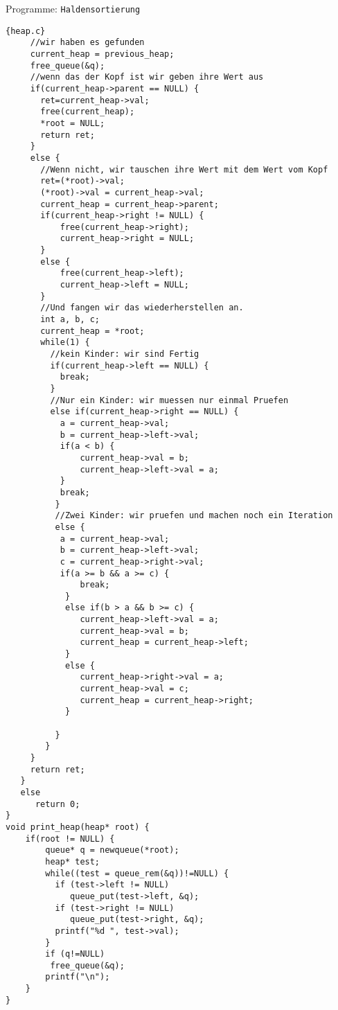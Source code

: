 \begin{myexampleprogram}{Programme: \texttt{Haldensortierung}}
\begin{lstlisting}{heap.c}
     //wir haben es gefunden
     current_heap = previous_heap;
     free_queue(&q);
     //wenn das der Kopf ist wir geben ihre Wert aus
     if(current_heap->parent == NULL) {
       ret=current_heap->val;
       free(current_heap);
       *root = NULL;
       return ret;
     }
     else {
       //Wenn nicht, wir tauschen ihre Wert mit dem Wert vom Kopf
       ret=(*root)->val;
       (*root)->val = current_heap->val;
       current_heap = current_heap->parent;
       if(current_heap->right != NULL) {
           free(current_heap->right);
           current_heap->right = NULL;
       }
       else {
           free(current_heap->left);
           current_heap->left = NULL;
       }
       //Und fangen wir das wiederherstellen an.
       int a, b, c;
       current_heap = *root;
       while(1) {
         //kein Kinder: wir sind Fertig
         if(current_heap->left == NULL) {
           break;
         }
         //Nur ein Kinder: wir muessen nur einmal Pruefen
         else if(current_heap->right == NULL) {
           a = current_heap->val;
           b = current_heap->left->val;
           if(a < b) {
               current_heap->val = b;
               current_heap->left->val = a;
           }
           break;
          }
          //Zwei Kinder: wir pruefen und machen noch ein Iteration
          else {           
           a = current_heap->val;
           b = current_heap->left->val;
           c = current_heap->right->val;
           if(a >= b && a >= c) {
               break;
            }
            else if(b > a && b >= c) {
               current_heap->left->val = a;
               current_heap->val = b;
               current_heap = current_heap->left;
            }
            else {
               current_heap->right->val = a;
               current_heap->val = c;
               current_heap = current_heap->right;
            }

          }
        }
     }
     return ret;
   }
   else
      return 0;
}
void print_heap(heap* root) {
    if(root != NULL) {
        queue* q = newqueue(*root);
        heap* test;
        while((test = queue_rem(&q))!=NULL) {
          if (test->left != NULL)
             queue_put(test->left, &q);
          if (test->right != NULL)
             queue_put(test->right, &q);
          printf("%d ", test->val);
        }
        if (q!=NULL)
         free_queue(&q);
        printf("\n");
    }
}
\end{lstlisting}
\end{myexampleprogram}
